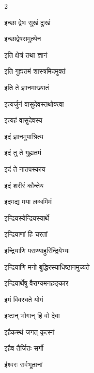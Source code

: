 \begin{multicols}{2}
\begin{indexlist}
\item इच्छा द्वेषः सुखं दुःखं \dotfill {}
\item इच्छाद्वेषसमुत्थेन \dotfill {}
\item इति क्षेत्रं तथा ज्ञानं \dotfill {}
\item इति गुह्यतमं शास्त्रमिदमुक्तं \dotfill {}
\item इति ते ज्ञानमाख्यातं \dotfill {}
\item इत्यर्जुनं वासुदेवस्तथोक्त्वा \dotfill {}
\item इत्यहं वासुदेवस्य \dotfill {}
\item इदं ज्ञानमुपाश्रित्य \dotfill {}
\item इदं तु ते गुह्यतमं \dotfill {}
\item इदं ते नातपस्काय \dotfill {}
\item इदं शरीरं कौन्तेय \dotfill {}
\item इदमद्य मया लब्धमिमं \dotfill {}
\item इन्द्रियस्येन्द्रियस्यार्थे \dotfill {}
\item इन्द्रियाणां हि चरतां \dotfill {}
\item इन्द्रियाणि पराण्याहुरिन्द्रियेभ्यः \dotfill {}
\item इन्द्रियाणि मनो बुद्धिरस्याधिष्ठानमुच्यते \dotfill {}
\item इन्द्रियार्थेषु वैराग्यमनहङ्कार \dotfill {}
\item इमं विवस्वते योगं \dotfill {}
\item इष्टान् भोगान् हि वो देवा \dotfill {}
\item इहैकस्थं जगत् कृत्स्नं \dotfill {}
\item इहैव तैर्जितः सर्गो \dotfill {}
\end{indexlist}

\begin{indexlist}
\item ईश्वरः सर्वभूतानां \dotfill {}
\end{indexlist}


\end{multicols}

